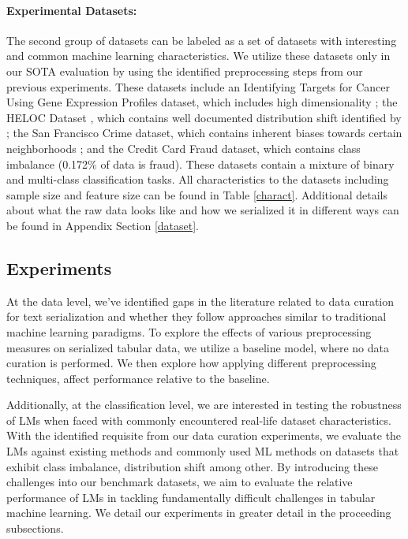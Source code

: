 \documentclass{article}
\theoremstyle{plain}
\theoremstyle{definition}
\theoremstyle{remark}
\begin{document}
\paragraph{Experimental Datasets:} The second group of datasets can be labeled as a set of datasets with interesting and common machine learning characteristics. We utilize these datasets only in our SOTA evaluation by using the identified preprocessing steps from our previous experiments. These datasets include an Identifying Targets for Cancer Using Gene Expression Profiles dataset, which includes high dimensionality \citep{misc_gene_expression_cancer_rna-seq_401}; the HELOC Dataset \cite{brown2018heloc}, which contains well documented distribution shift identified by \citep{gardner2023tableshift}; the San Francisco Crime dataset, which contains inherent biases towards certain neighborhoods \citep{asuncion2007uci}; and the Credit Card Fraud dataset, which contains class imbalance \citep{dal2015calibrating} (0.172\% of data is fraud). These datasets contain a mixture of binary and multi-class classification tasks. All characteristics to the datasets including sample size and feature size can be found in Table \ref{charact}. Additional details about what the raw data looks like and how we serialized it in different ways can be found in Appendix Section \ref{dataset}.

\subsection{Experiments}

At the data level, we've identified gaps in the literature related to data curation for text serialization and whether they follow approaches similar to traditional machine learning paradigms. To explore the effects of various preprocessing measures on serialized tabular data, we utilize a baseline model, where no data curation is performed. We then explore how applying different preprocessing techniques, affect performance relative to the baseline.

Additionally, at the classification level, we are interested in testing the robustness of LMs when faced with commonly encountered real-life dataset characteristics. With the identified requisite from our data curation experiments, we evaluate the LMs against existing methods and commonly used ML methods on datasets that exhibit class imbalance, distribution shift among other. By introducing these challenges into our benchmark datasets, we aim to evaluate the relative performance of LMs in tackling fundamentally difficult challenges in tabular machine learning. We detail our experiments in greater detail in the proceeding subsections.
\end{document}
